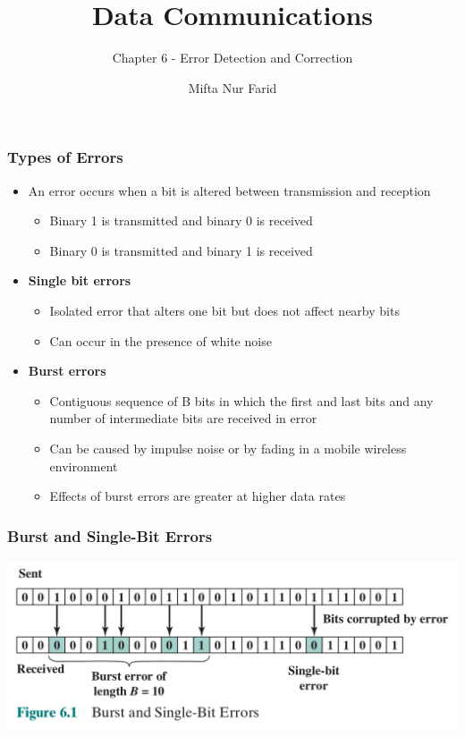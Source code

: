 \documentclass[pdflatex,compress]{beamer}
\title{Data Communications}
\subtitle{Chapter 6 - Error Detection and Correction}
\author{Mifta Nur Farid}
\begin{document}
\maketitle

\begin{frame}
	\frametitle{Types of Errors}
	\begin{itemize}
		\item An error occurs when a bit is altered between transmission and reception
		\begin{itemize}
			\item Binary 1 is transmitted and binary 0 is received
			\item Binary 0 is transmitted and binary 1 is received
		\end{itemize}
		\item \textbf{Single bit errors}
		\begin{itemize}
			\item Isolated error that alters one bit but does not affect nearby bits
			\item Can occur in the presence of white noise
		\end{itemize}
		\item \textbf{Burst errors}
		\begin{itemize}
			\item Contiguous sequence of B bits in which the first and last bits and any number of intermediate bits are received in error
			\item Can be caused by impulse noise or by fading in a mobile wireless environment
			\item Effects of burst errors are greater at higher data rates
		\end{itemize}
	\end{itemize}
\end{frame}

\begin{frame}
	\frametitle{Burst and Single-Bit Errors}
	\begin{center}
		\includegraphics[width=\linewidth]{img/img01}
	\end{center}
\end{frame}
\end{document}
